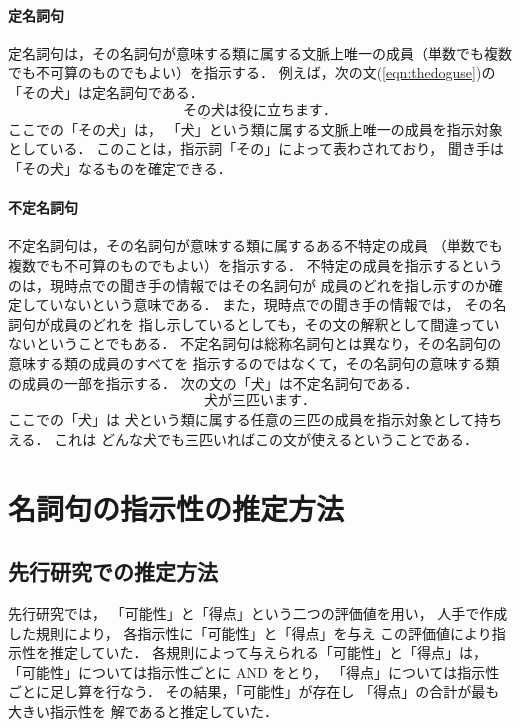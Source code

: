\paragraph{定名詞句}

定名詞句は，その名詞句が意味する類に属する文脈上唯一の成員（単数でも複数でも不可算のものでもよい）を指示する．
例えば，次の文(\ref{eqn:thedoguse})の「その犬」は定名詞句である．
\begin{equation}
\underline{その犬}は役に立ちます．
  \label{eqn:thedoguse}
\end{equation}
ここでの「その犬」は，
「犬」という類に属する文脈上唯一の成員を指示対象としている．
このことは，指示詞「その」によって表わされており，
聞き手は「その犬」なるものを確定できる．

\paragraph{不定名詞句}

不定名詞句は，その名詞句が意味する類に属するある不特定の成員
（単数でも複数でも不可算のものでもよい）を指示する．
不特定の成員を指示するというのは，現時点での聞き手の情報ではその名詞句が
成員のどれを指し示すのか確定していないという意味である．
また，現時点での聞き手の情報では，
その名詞句が成員のどれを
指し示しているとしても，その文の解釈として間違っていないということでもある．
不定名詞句は総称名詞句とは異なり，その名詞句の意味する類の成員のすべてを
指示するのではなくて，その名詞句の意味する類の成員の一部を指示する．
次の文の「犬」は不定名詞句である．
\begin{equation}
\underline{犬}が三匹います．
  \label{eqn:dog3}
\end{equation}
ここでの「犬」は
犬という類に属する任意の三匹の成員を指示対象として持ちえる．
これは
どんな犬でも三匹いればこの文が使えるということである．


\section{名詞句の指示性の推定方法}\label{sec:decide}

\subsection{先行研究での推定方法}\label{sec:decide_pre}

先行研究\cite{murata_noun_nlp}では，
「可能性」と「得点」という二つの評価値を用い，
人手で作成した規則により，
各指示性に「可能性」と「得点」を与え
この評価値により指示性を推定していた．
各規則によって与えられる「可能性」と「得点」は，
「可能性」については指示性ごとに AND をとり，
「得点」については指示性ごとに足し算を行なう．
その結果，「可能性」が存在し
「得点」の合計が最も大きい指示性を
解であると推定していた．

